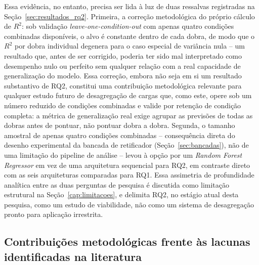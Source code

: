 \documentclass[times,final]{elsarticle}
\begin{document}
Essa evidência, no entanto, precisa ser lida à luz de duas ressalvas registradas na Seção~\ref{sec:resultados_rq2}. Primeira, a correção metodológica do próprio cálculo de $R^2$: sob validação \textit{leave-one-condition-out} com apenas quatro condições combinadas disponíveis, o alvo é constante dentro de cada dobra, de modo que o $R^2$ por dobra individual degenera para o caso especial de variância nula -- um resultado que, antes de ser corrigido, poderia ter sido mal interpretado como desempenho nulo ou perfeito sem qualquer relação com a real capacidade de generalização do modelo. Essa correção, embora não seja em si um resultado substantivo de RQ2, constitui uma contribuição metodológica relevante para qualquer estudo futuro de desagregação de cargas que, como este, opere sob um número reduzido de condições combinadas e valide por retenção de condição completa: a métrica de generalização real exige agrupar as previsões de todas as dobras antes de pontuar, não pontuar dobra a dobra. Segunda, o tamanho amostral de apenas quatro condições combinadas -- consequência direta do desenho experimental da bancada de retificador (Seção~\ref{sec:bancadas}), não de uma limitação do pipeline de análise -- levou à opção por um \textit{Random Forest Regressor} em vez de uma arquitetura sequencial para RQ2, em contraste direto com as seis arquiteturas comparadas para RQ1. Essa assimetria de profundidade analítica entre as duas perguntas de pesquisa é discutida como limitação estrutural na Seção~\ref{cap:limitacoes}, e delimita RQ2, no estágio atual desta pesquisa, como um estudo de viabilidade, não como um sistema de desagregação pronto para aplicação irrestrita.

\subsection{Contribuições metodológicas frente às lacunas identificadas na literatura}
\label{sec:discussao_contribuicoes}
\end{document}
